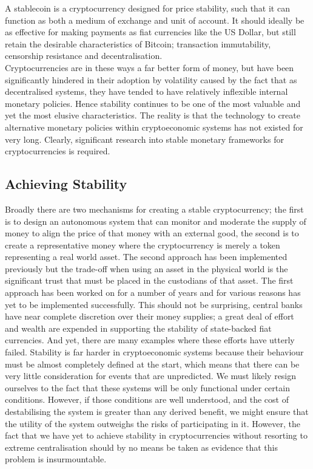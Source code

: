 \noindent A stablecoin is a cryptocurrency designed for price stability, such that it can function as
both a medium of exchange and unit of account. It should ideally be as effective for making payments
as fiat currencies like the US Dollar, but still retain the desirable characteristics of Bitcoin;
transaction immutability, censorship resistance and decentralisation. \\

\noindent Cryptocurrencies are in these ways a far better form of money, but have been significantly hindered
in their adoption by volatility caused by the fact that as decentralised systems, they have tended to have relatively inflexible internal
monetary policies. Hence stability continues to be one of the most valuable and yet the most elusive
characteristics. The reality is that the technology to create alternative monetary policies within
cryptoeconomic systems has not existed for very long. Clearly, significant research into stable monetary
frameworks for cryptocurrencies is required. \\

\subsection{Achieving Stability}

\noindent Broadly there are two mechanisms for creating a stable cryptocurrency; the first is to design an autonomous system that can monitor and moderate the supply of money to align the price of that money with an external good, the second is to create a representative money where the cryptocurrency is merely a token representing a real world asset. The second approach has been implemented previously but the trade-off when using an asset in the physical world is the significant trust that must be placed in the custodians of that asset. The first approach has been worked on for a number of years and for various reasons has yet to be implemented successfully. This should not be surprising, central banks have near complete discretion over their money supplies; a great deal of effort and wealth are expended in supporting the stability of state-backed fiat currencies.
And yet, there are many examples where these efforts have utterly failed.
Stability is far harder in cryptoeconomic systems because their behaviour must be almost completely
defined at the start, which means that there can be very little consideration for events that are unpredicted.
We must likely resign ourselves to the fact that these systems will be only functional under certain conditions.
However, if those conditions are well understood, and the cost of destabilising the system is greater than
any derived benefit, we might ensure that the utility of the system outweighs the risks of participating in it. However, the fact that we have yet to achieve stability in cryptocurrencies without resorting to extreme centralisation should by no means be taken as evidence that this problem is insurmountable. \\

